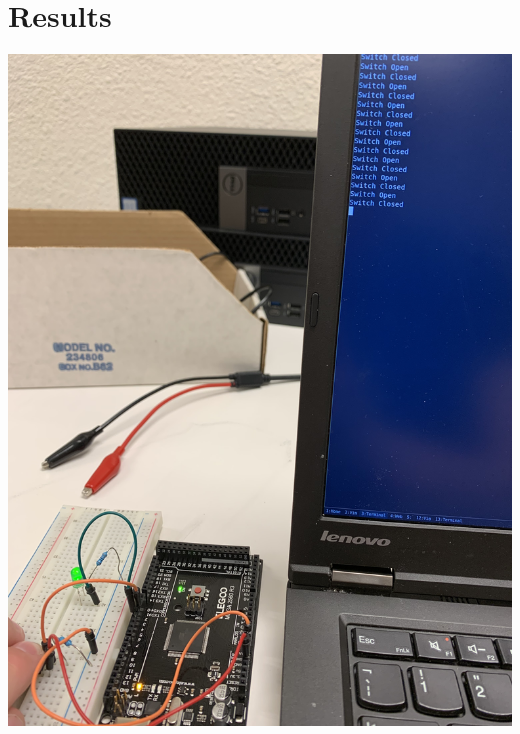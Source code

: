 \documentclass[]{article}
\begin{document}
\pagebreak
\section{Results}
\begin{center}
	\includegraphics[scale=.06,angle=-90]{2.jpg}\\

\end{center}
\end{document}
